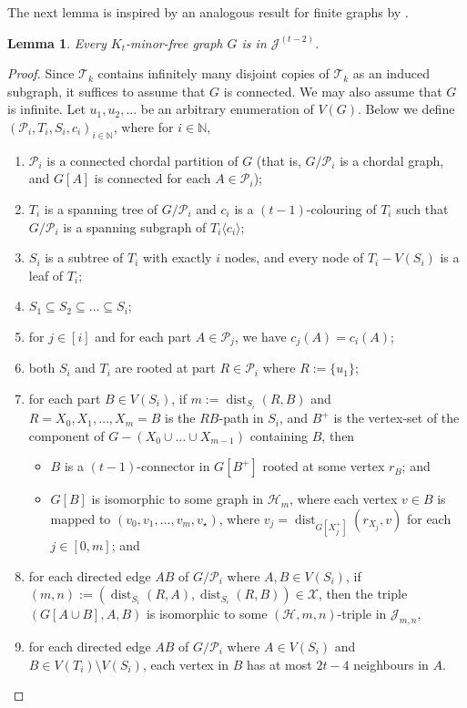 \documentclass[a4paper,11pt]{article}
\theoremstyle{plain}
\newtheorem{lem}[thm]{Lemma}
\theoremstyle{definition}
\DeclareMathOperator{\dist}{dist}
\newcommand{\XX}{\mathcal{X}}
\newcommand{\HH}{\mathcal{H}}
\newcommand{\JJ}{\mathcal{J}}
\newcommand{\TT}{\mathcal{T}}
\newcommand{\NN}{\mathbb{N}}
\newcommand{\PART}{\mathcal{P}}
\newcommand{\GGG}[2]{#1\langle{#2}\rangle}
\begin{document}
The next lemma is inspired by an analogous result for finite graphs by \citet{vdHW18}. 

\begin{lem}
\label{MinorJJJ}
Every $K_t$-minor-free graph $G$ is in $\JJ^{(t-2)}$. 
\end{lem}

\begin{proof}
Since $\TT_k$ contains infinitely many disjoint copies of $\TT_k$ as an induced subgraph, it suffices to assume that $G$ is connected. We may also assume that $G$ is infinite. Let $u_1,u_2,\dots$ be an arbitrary enumeration of $V(G)$. Below we define $(\PART_i,T_i,S_i,c_i)_{i\in\NN}$, where for $i\in\NN$, 
\begin{enumerate}[(P1)] 
 \item $\PART_i$ is a connected chordal partition of $G$ (that is, $G/\PART_i$ is a chordal graph, and $G[A]$ is connected for each $A\in\PART_i$);
 \item $T_i$ is a spanning tree of $G/\PART_i$ and $c_i$ is a $(t-1)$-colouring of $T_i$ such that $G/\PART_i$ is a spanning subgraph of $\GGG{T_i}{c_i}$;
\item  $S_i$ is a subtree of $T_i$ with exactly $i$ nodes, and every node of $T_i-V(S_i)$ is a leaf of $T_i$;
\item $S_1\subseteq S_2\subseteq \dots\subseteq S_i $;
\item for $j\in[i]$ and for each part $A\in\PART_j$, we have $c_j(A)=c_i(A)$;
\item both $S_i$ and $T_i$ are rooted at part $R\in\PART_i$ where $R:=\{u_1\}$;
 \item for each part $B\in V(S_i)$, if $m:=\dist_{S_i}(R,B)$ and $R=X_0,X_1,\dots,X_m=B$ is the $RB$-path in $S_i$, and $B^+$ is the vertex-set of the component of $G-(X_0\cup\dots\cup X_{m-1})$ containing $B$, then 
\begin{itemize}
\item $B$ is a $(t-1)$-connector in $G[B^+]$ rooted at some vertex $r_B$; and 
\item $G[B]$ is isomorphic to some graph in $\HH_m$, where each vertex $v\in B$ is mapped to $(v_0,v_1,\dots,v_m,v_\star)$, where $v_j=\dist_{G[X^+_j]}(r_{X_j},v)$ for each $j\in[0,m]$; and 
\end{itemize}
\item for each directed edge $AB$ of $G/\PART_i$ where $A,B\in V(S_i)$, if $(m,n):=(\dist_{S_i}(R,A),\dist_{S_i}(R,B))\in\XX$, then the triple $(G[A\cup B], A,B)$ is isomorphic to some $(\HH,m,n)$-triple in $\JJ_{m,n}$,
\item for each directed edge $AB$ of $G/\PART_i$ where $A\in V(S_i)$ and $B\in V(T_i)\setminus V(S_i)$, each vertex in $B$ has at most $2t-4$ neighbours in $A$. 
\end{enumerate}


\end{proof}
\end{document}
